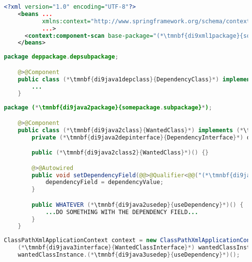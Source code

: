 \begin{lstlisting}[language=XML, title={Configuration XML}]
    <?xml version="1.0" encoding="UTF-8"?>
    <beans ...
           xmlns:context="http://www.springframework.org/schema/context"
           ...>
      <context:component-scan base-package="(*\tmnbf{di9xml1package}{somepackage.subpackage}[ForestGreen]*)"/>
    </beans>
\end{lstlisting}
\begin{lstlisting}[language=Java, title={Dependency class}]
    package deppackage.depsubpackage;

    @>@Component
    public class (*\tmnbf{di9java1depclass}{DependencyClass}*) implements (*\tmnbf{di9java1depinterface}{DependencyInterface}*) {
        ...
    }
\end{lstlisting}
\begin{lstlisting}[language=Java, title={Wanted class with the zero--parameter constructor and the setter method}]
    package (*\tmnbf{di9java2package}{somepackage.subpackage}*);

    @>@Component
    public class (*\tmnbf{di9java2class}{WantedClass}*) implements (*\tmnbf{di9java2interface}{WantedClassInterface}*) {
        private (*\tmnbf{di9java2depinterface}{DependencyInterface}*) dependencyField;

        public (*\tmnbf{di9java2class2}{WantedClass}*)() {}

        @>@Autowired
        public void setDependencyField(@@>@Qualifier<@@("(*\tmnbf{di9java2depbeanid}{dependencyClass}[ForestGreen]*)") (*\tmnbf{di9java2depinterface2}{DependencyInterface}*) dependencyValue) {
            dependencyField = dependencyValue;
        }

        public WHATEVER (*\tmnbf{di9java2usedep}{useDependency}*)() {
            ...DO SOMETHING WITH THE DEPENDENCY FIELD...
        }
    }
\end{lstlisting}
\begin{lstlisting}[language=Java, title={Usage}]
    ClassPathXmlApplicationContext context = new ClassPathXmlApplicationContext("configurationFile.xml");
    (*\tmnbf{di9java3interface}{WantedClassInterface}*) wantedClassInstance = context.getBean("(*\tmnbf{di9java3beanid}{wantedClass}[ForestGreen]*)", (*\tmnbf{di9java3interface2}{WantedClassInterface}*).class);
    wantedClassInstance.(*\tmnbf{di9java3usedep}{useDependency}*)();
\end{lstlisting}
\newpage

